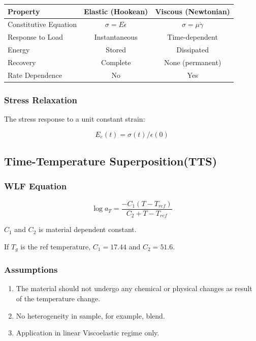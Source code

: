 \documentclass{NoteThesis/note-thesis}
\begin{document}
\begin{table}[h]
    \centering
    \label{tab:elastic_viscous}
    \begin{tabular}{lcc}
        \hline
        \textbf{Property} & \textbf{Elastic (Hookean)} & \textbf{Viscous (Newtonian)} \\
        \hline
        Constitutive Equation & $\sigma = E\epsilon$ & $\sigma = \mu\dot{\gamma}$ \\
        Response to Load & Instantaneous & Time-dependent \\
        Energy & Stored & Dissipated \\
        Recovery & Complete & None (permanent) \\
        Rate Dependence & No & Yes \\
        \hline
    \end{tabular}
\end{table}

\subsubsection*{Stress Relaxation}

The stress response to a unit constant strain:

\begin{equation*}
    E_e(t) = \sigma(t) / \epsilon(0)
\end{equation*}

\subsection{Time-Temperature Superposition(TTS)}

\subsubsection*{WLF Equation}

\begin{equation*}
    \log a_T = \frac{-C_1(T-T_{ref})}{C_2+T-T_{ref}}
\end{equation*}

$C_1$ and $C_2$ is material dependent constant.

If $T_g$ is the ref temperature, $C_1=17.44$ and $C_2=51.6$.

\subsubsection*{Assumptions}

\begin{enumerate}
    \item The material should not undergo any chemical or physical changes as result of the temperature change.
    \item No heterogeneity in sample, for example, blend.
    \item Application in linear Viscoelastic regime only.
\end{enumerate}
\end{document}
